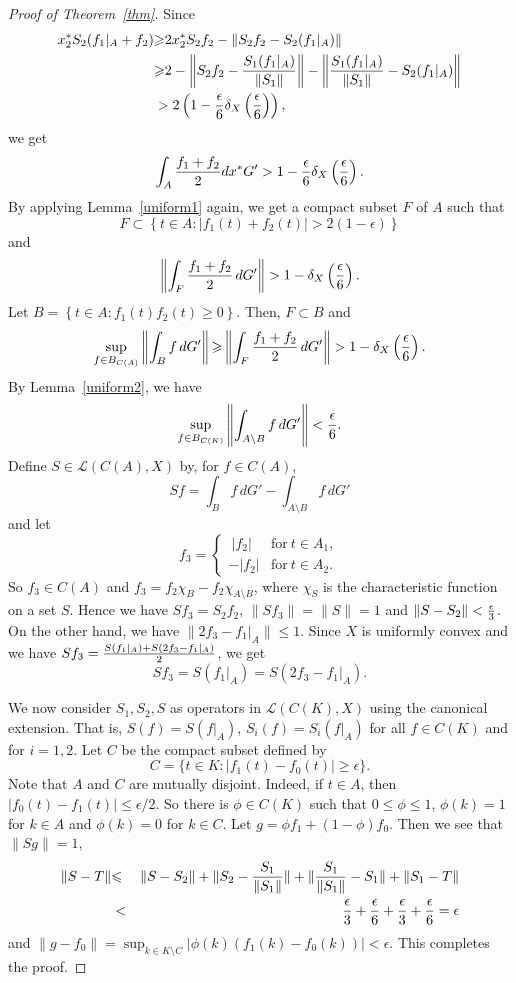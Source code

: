 \documentclass[a4paper]{amsart}
\theoremstyle{plain}
\theoremstyle{definition}
\begin{document}
\begin{proof}[Proof of Theorem~\ref{thm}]
Since
\begin{align*}
x^*_2S_2(f_1|_A+f_2)
&{\geqslant} 2x^*_2S_2f_2-\left\|S_2f_2-S_2(f_1|_A)\right\|\\
&{\geqslant} 2-\left\|S_2f_2-{{S_1(f_1|_A)}\over{\|S_1\|}}\right\|-\left\|{{S_1(f_1|_A)}\over{\|S_1\|}}-S_2(f_1|_A)\right\|\\
&>2\left(1-{{\epsilon}\over{6}}\delta_X\left({{\epsilon}\over{6}}\right)\right),
\end{align*}
we get
\[\int_{A}{{f_1+f_2}\over{2}}dx^*G'>1-{{\epsilon}\over{6}}\delta_X\left({{\epsilon}\over{6}}\right).\] By applying Lemma~\ref{uniform1} again, we get a compact subset $F$ of $A$ such that
\[ F \subset \left\{t\in A : \left| {f_1(t)+f_2(t)}\right|> 2(1-\epsilon) \right\} \] and
 $$\left\|\int_{F}{{f_1+f_2}\over{2}}\, dG'\right\|>1-\delta_X\left({{\epsilon}\over{6}}\right).$$
Let $B= \left\{t\in A :  f_1(t)f_2(t){\geqslant} 0 \right\}$. Then,  $F\subset B$ and
 $$ \sup_{f\in B_{C(A)} } \left\|\int_B f \, dG'  \right\| {\geqslant}\left\|\int_{F}{{f_1+f_2}\over{2}}\, dG'\right\|>1-\delta_X\left({{\epsilon}\over{6}}\right).$$ By Lemma~\ref{uniform2}, we have
\[\sup_{f\in B_{C(K)}}\left\|\int_{A\setminus B}f\, dG'\right\|<{{\epsilon}\over{6}}.\]
Define $S\in {\mathcal{L}(C(A),X)}$ by, for $f\in C(A)$,
\[Sf=\int_{B}f\, dG'-\int_{A\setminus B}f\, dG'\]  and let
\[
f_3 = \left\{
  \begin{array}{ll}
   \ |f_2|& \text{for}\  t\in A_1,\\
   -|f_2|& \text{for}\  t\in A_2.
  \end{array}
\right.
\] So $f_3\in C(A)$ and $f_3 = f_2 \chi_{B} - f_2 \chi_{A\setminus B}$, where $\chi_S$ is the characteristic function on a set $S$. Hence we have  $Sf_3=S_2f_2$,  $\|Sf_3\|=\|S\|=1$ and $\|S-S_2\|<{{\epsilon}\over{3}}$. On the other hand, we have $\|2f_3-f_1|_A\|{\leqslant} 1$. Since $X$ is uniformly convex and we have
$Sf_3={{S(f_1|_A)+S(2f_3-f_1|_A)}\over{2}}$, we get
\[Sf_3=S(f_1|_A)=S(2f_3-f_1|_A).\]

We now consider $S_1, S_2, S$ as operators in $\mathcal{L}(C(K),X)$ using the canonical extension. That is, $S(f) = S(f|_A)$, $S_i(f)=S_i(f|_A)$ for all $f\in C(K)$ and for $i=1,2$. Let $C$ be the compact subset defined by $$C=\{t\in K : |f_1(t)-f_0(t)|{\geqslant} \epsilon\}.$$   Note that $A$ and $C$ are mutually disjoint. Indeed, if $t\in A$, then $|f_0(t) - f_1(t)|\le \epsilon/2$. So there is $\phi \in C(K)$ such that $0{\leqslant} \phi {\leqslant} 1$, $\phi(k)=1$ for $k\in A$ and $\phi(k)=0$ for $k\in C$. Let $g=\phi f_1+(1-\phi)f_0$. Then we see that $\|Sg\|=1$,
  \begin{eqnarray*}
  \|S-T\|
  &{\leqslant}&\|S-S_2\|+\|S_2-{{S_1}\over{\|S_1\|}}\|+\|{{S_1}\over{\|S_1\|}}-S_1\|+\|S_1-T\|\\
  &<&{{\epsilon}\over{3}}+{{\epsilon}\over{6}}+{{\epsilon}\over{3}}+{{\epsilon}\over{6}}=\epsilon
  \end{eqnarray*}
and $\|g-f_0\|= \sup_{k\in K\setminus C}|\phi(k)(f_1(k)-f_0(k))|< \epsilon$. This completes the proof.
\end{proof}
\end{document}
